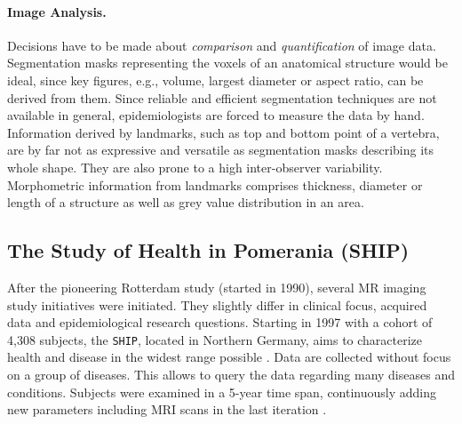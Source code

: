 \documentclass[journal]{style/vgtc} 			          %
\newcommand{\rem}[1]{\textcolor{red}{\sout{#1}}}
\begin{document}
\paragraph{Image Analysis.}
%
Decisions have to be made about \emph{comparison} and \emph{quantification} of image data.
%
Segmentation masks representing the voxels of an anatomical structure would be ideal, since key figures, e.g., volume, largest diameter or aspect ratio, can be derived from them.
%
Since reliable and efficient segmentation techniques are not available in general, epidemiologists are forced to measure the data by hand. %
%
Information derived by landmarks, such as top and bottom point of a vertebra, are by far not as expressive and versatile as segmentation masks describing its whole shape.
%
They are also prone to a high inter-observer variability.
%
%
Morphometric information from landmarks comprises thickness, diameter or length of a structure as well as grey value distribution in an area. %


\subsection{The Study of Health in Pomerania (SHIP)}
After the pioneering Rotterdam study (started in 1990), several MR imaging study initiatives were initiated.
%
They slightly differ in clinical focus, acquired data and epidemiological research questions.
%
Starting in 1997 with a cohort of 4,308 subjects, the \texttt{SHIP}, located in Northern Germany, aims to characterize health and disease in the widest range possible \cite{Volzke2011}.
%
Data are collected without focus on a group of diseases.
%
This allows to query the data regarding many diseases and conditions.
%
Subjects were examined in a 5-year time span, continuously adding new parameters including MRI scans in the last iteration \cite{Hegenscheid2009}.
%
%
\end{document}
